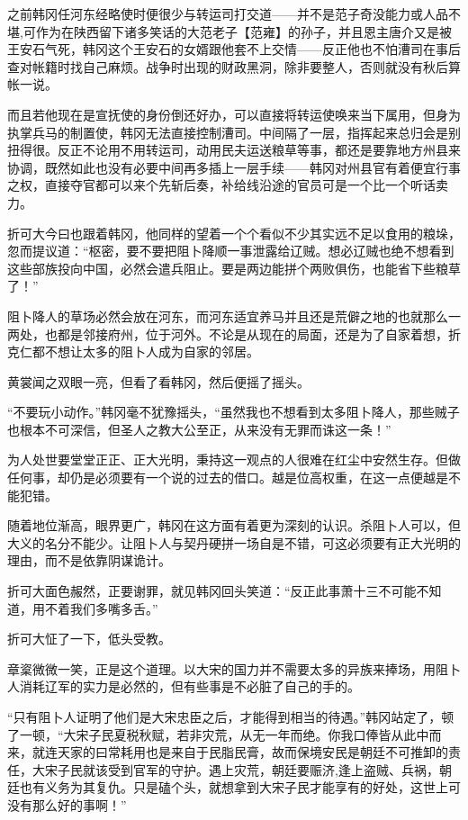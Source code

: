 之前韩冈任河东经略使时便很少与转运司打交道——并不是范子奇没能力或人品不堪,可作为在陕西留下诸多笑话的大范老子【范雍】的孙子，并且恩主唐介又是被王安石气死，韩冈这个王安石的女婿跟他套不上交情——反正他也不怕漕司在事后查对帐籍时找自己麻烦。战争时出现的财政黑洞，除非要整人，否则就没有秋后算帐一说。

而且若他现在是宣抚使的身份倒还好办，可以直接将转运使唤来当下属用，但身为执掌兵马的制置使，韩冈无法直接控制漕司。中间隔了一层，指挥起来总归会是别扭得很。反正不论用不用转运司，动用民夫运送粮草等事，都还是要靠地方州县来协调，既然如此也没有必要中间再多插上一层手续——韩冈对州县官有着便宜行事之权，直接夺官都可以来个先斩后奏，补给线沿途的官员可是一个比一个听话卖力。

折可大今曰也跟着韩冈，他同样的望着一个个看似不少其实远不足以食用的粮垛，忽而提议道：“枢密，要不要把阻卜降顺一事泄露给辽贼。想必辽贼也绝不想看到这些部族投向中国，必然会遣兵阻止。要是两边能拼个两败俱伤，也能省下些粮草了！”

阻卜降人的草场必然会放在河东，而河东适宜养马并且还是荒僻之地的也就那么一两处，也都是邻接府州，位于河外。不论是从现在的局面，还是为了自家着想，折克仁都不想让太多的阻卜人成为自家的邻居。

黄裳闻之双眼一亮，但看了看韩冈，然后便摇了摇头。

“不要玩小动作。”韩冈毫不犹豫摇头，“虽然我也不想看到太多阻卜降人，那些贼子也根本不可深信，但圣人之教大公至正，从来没有无罪而诛这一条！”

为人处世要堂堂正正、正大光明，秉持这一观点的人很难在红尘中安然生存。但做任何事，却仍是必须要有一个说的过去的借口。越是位高权重，在这一点便越是不能犯错。

随着地位渐高，眼界更广，韩冈在这方面有着更为深刻的认识。杀阻卜人可以，但大义的名分不能少。让阻卜人与契丹硬拼一场自是不错，可这必须要有正大光明的理由，而不是依靠阴谋诡计。

折可大面色赧然，正要谢罪，就见韩冈回头笑道：“反正此事萧十三不可能不知道，用不着我们多嘴多舌。”

折可大怔了一下，低头受教。

章楶微微一笑，正是这个道理。以大宋的国力并不需要太多的异族来捧场，用阻卜人消耗辽军的实力是必然的，但有些事是不必脏了自己的手的。

“只有阻卜人证明了他们是大宋忠臣之后，才能得到相当的待遇。”韩冈站定了，顿了一顿，“大宋子民夏税秋赋，若非灾荒，从无一年而绝。你我口俸皆从此中而来，就连天家的曰常耗用也是来自于民脂民膏，故而保境安民是朝廷不可推卸的责任，大宋子民就该受到官军的守护。遇上灾荒，朝廷要赈济,逢上盗贼、兵祸，朝廷也有义务为其复仇。只是磕个头，就想拿到大宋子民才能享有的好处，这世上可没有那么好的事啊！”

